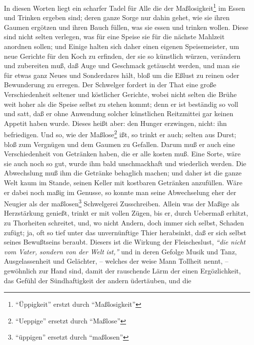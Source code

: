 \medskip

In diesen Worten liegt ein scharfer Tadel für Alle die der Maßlosigkeit\footnote{"`Üppigkeit"' erstzt durch "`Maßlosigkeit"'} im Essen
und Trinken ergeben sind; deren ganze Sorge nur dahin gehet, wie sie ihren
Gaumen ergötzen und ihren Bauch füllen, was sie essen und trinken wollen. Diese
sind nicht selten verlegen, was für eine Speise sie für die nächste Mahlzeit
anordnen sollen; und Einige halten sich daher einen eigenen Speisemeister, um
neue Gerichte für den Koch zu erfinden, der sie so künstlich würzen, verändern
und zubereiten muß, daß Auge und Geschmack getäuscht werden, und man sie für
etwas ganz Neues und Sonderdares hält, bloß um die Eßlust zu reinen oder
Bewunderung zu erregen. Der Schwelger fordert in der That eine große
Verschiedenheit seltener und köstlicher Gerichte, wobei nicht selten die Brühe
weit hoher als die Speise selbst zu stehen kommt; denn er ist beständig so voll
und satt, daß er ohne Anwendung solcher künstlichen Reitzmittei gar keinen
Appetit haben wurde. Dieses heißt aber: den Hunger erzwingen, nicht: ihn
befriedigen. Und so, wie der Maßlose\footnote{"`Ueppige"' ersetzt durch "`Maßlose"'} ißt, so trinkt er auch; selten aus Durst;
bloß zum Vergnügen und dem Gaumen zu Gefallen. Darum muß er auch eine
Verschiedenheit von Getränken haben, die er alle kosten muß. Eine Sorte, wäre
sie auch noch so gut, wurde ihm bald unschmackhaft und wiederlich werden. Die
Abwechslung muß ihm die Getränke behaglich machen; und daher ist die ganze Welt
kaum im Stande, seinen Keller mit kostbaren Getränken anzufüllen. Wäre er dabei
noch maßig im Genusse, so konnte man seine Abwechselung eher der Neugier als der
maßlosen\footnote{"`üppigen"' ersetzt durch "`maßlosen"'} Schwelgerei Zusschreiben. Allein was der Maßige als Herzstärkung
genießt, trinkt er mit vollen Zügen, bis er, durch Uebermaß erhitzt, zu
Thorheiten schreitet, und, wo nicht Andern, doch immer sich selbst, Schaden
zufügt; ja, oft so tief unter das unvernünftige Thier herabsinkt, daß er sich
selbst seines Bewußtseins beraubt. Diesers ist die Wirkung der Fleischeslust,
\textit{"`die nicht vom Vater, sondern von der Welt ist,"'} und in deren Gefolge Musik und Tanz, Ausgelassenheit und Gelächter, -- welches der weise Mann Tollheit
nennt, -- gewöhnlich zur Hand sind, damit der rauschende Lärm der einen
Ergözlichkeit, das Gefühl der Sündhaftigkeit der andern üdertäuben, und die
